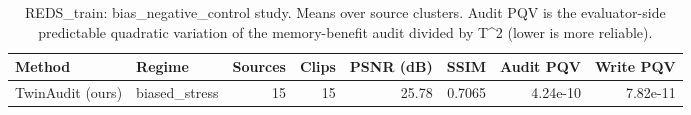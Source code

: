 \begin{table}[t]
\centering
\caption{REDS\_train: bias\_negative\_control study. Means over source clusters. Audit PQV is the evaluator-side predictable quadratic variation of the memory-benefit audit divided by T^2 (lower is more reliable).}
\label{tab:bias_negative_control_REDS_train}
\small
\begin{tabular}{llrrrrrr}
\toprule
Method & Regime & Sources & Clips & PSNR (dB) & SSIM & Audit PQV & Write PQV \\
\midrule
TwinAudit (ours) & biased\_stress & 15 & 15 & 25.78 & 0.7065 & 4.24e-10 & 7.82e-11 \\
\bottomrule
\end{tabular}
\end{table}

